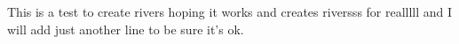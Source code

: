 \documentclass{minimal}
\begin{document}
\parbox{4cm}{
This is a test to create \linebreak
rivers hoping it works and \linebreak
creates riversss for realllll \linebreak
and I will add just another \linebreak
line to be sure it's ok.
}
\end{document}
